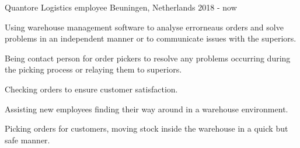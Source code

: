 \begin{cventries}
\cventry
    {Quantore} %
    {Logistics employee} %
    {Beuningen, Netherlands} %
    {2018 - now} %
    {
      \begin{cvitems}
        \item {Using warehouse management software to analyse errorneaus orders and solve problems in an independent manner or to communicate issues with the superiors.}
        \item {Being contact person for order pickers to resolve any problems occurring during the picking process or relaying them to superiors.}
        \item {Checking orders to ensure customer satisfaction.}
        \item {Assisting new employees finding their way around in a warehouse environment.}
        \item {Picking orders for customers, moving stock inside the warehouse in a quick but safe manner.}
      \end{cvitems}
    }
\end{cventries}
